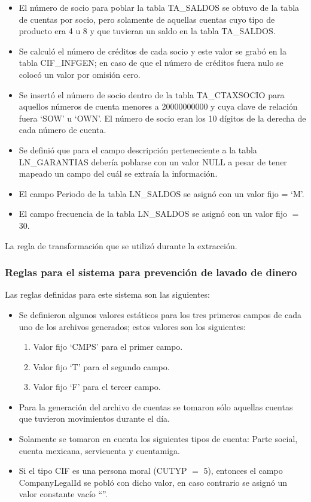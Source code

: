 \begin{itemize}
\item El número de socio para poblar la tabla TA\_SALDOS se obtuvo de la
  tabla de cuentas por socio, pero solamente de aquellas cuentas cuyo tipo de
  producto era 4 u 8 y que tuvieran un saldo en la tabla TA\_SALDOS.

\item Se calculó el número de créditos de cada socio y este valor se grabó en
  la tabla CIF\_INFGEN; en caso de que el número de créditos fuera nulo se
  colocó un valor por omisión cero.

\item Se insertó el número de socio dentro de la tabla TA\_CTAXSOCIO para
  aquellos números de cuenta menores a 20000000000 y cuya clave de relación
  fuera `SOW' u `OWN'. El número de socio eran los 10 dígitos de la derecha de
  cada número de cuenta.

\item Se definió que para el campo descripción perteneciente a la tabla
  LN\_GARANTIAS debería poblarse con un valor NULL a pesar de tener mapeado un
  campo del cuál se extraía la información.

\item El campo Periodo de la tabla LN\_SALDOS se asignó con un valor fijo =
  `M'.

\item El campo frecuencia de la tabla LN\_SALDOS se asignó con un valor fijo
  $=$ 30.

\end{itemize}

La regla de transformación que se utilizó durante la extracción.

\subsubsection{Reglas para el sistema para prevención de lavado de dinero}

Las reglas definidas para este sistema son las siguientes:

\begin{itemize}
\item Se definieron algunos valores estáticos para los tres primeros campos de
  cada uno de los archivos generados; estos valores son los siguientes:
\begin{enumerate}
\item Valor fijo `CMPS' para el primer campo.
\item Valor fijo `T' para el segundo campo.
\item Valor fijo `F' para el tercer campo.
\end{enumerate}
\item Para la generación del archivo de cuentas se tomaron sólo aquellas
  cuentas que tuvieron movimientos durante el día.
\item Solamente se tomaron en cuenta los siguientes tipos de cuenta: Parte
  social, cuenta mexicana, servicuenta y cuentamiga.
\item Si el tipo CIF es una persona moral (CUTYP $=$ 5), entonces el campo
  CompanyLegalId se pobló con dicho valor, en caso contrario se asignó un valor
  constante vacío ``''.
\end{itemize}

